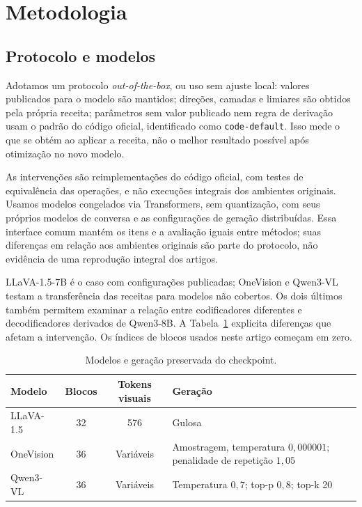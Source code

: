 \section{Metodologia}
\subsection{Protocolo e modelos}
Adotamos um protocolo \textit{out-of-the-box}, ou uso sem ajuste local: valores publicados para o modelo são mantidos; direções, camadas e limiares são obtidos pela própria receita; parâmetros sem valor publicado nem regra de derivação usam o padrão do código oficial, identificado como \texttt{code-default}. Isso mede o que se obtém ao aplicar a receita, não o melhor resultado possível após otimização no novo modelo.

As intervenções são reimplementações do código oficial, com testes de equivalência das operações, e não execuções integrais dos ambientes originais. Usamos modelos congelados via Transformers, sem quantização, com seus próprios modelos de conversa e as configurações de geração distribuídas. Essa interface comum mantém os itens e a avaliação iguais entre métodos; suas diferenças em relação aos ambientes originais são parte do protocolo, não evidência de uma reprodução integral dos artigos.

LLaVA-1.5-7B é o caso com configurações publicadas; OneVision e Qwen3-VL testam a transferência das receitas para modelos não cobertos. Os dois últimos também permitem examinar a relação entre codificadores diferentes e decodificadores derivados de Qwen3-8B. A Tabela~\ref{tab:modelos} explicita diferenças que afetam a intervenção. Os índices de blocos usados neste artigo começam em zero.

\begin{table}[t]
\centering\small
\caption{Modelos e geração preservada do checkpoint.}
\label{tab:modelos}
\setlength{\tabcolsep}{5pt}
\begin{tabular}{lccp{3.0cm}}
\toprule
Modelo & Blocos & Tokens visuais & Geração \\
\midrule
LLaVA-1.5 & 32 & 576 & Gulosa \\
OneVision & 36 & Variáveis & Amostragem, temperatura $0{,}000001$; penalidade de repetição $1{,}05$ \\
Qwen3-VL & 36 & Variáveis & Temperatura $0{,}7$; top-p $0{,}8$; top-k 20 \\
\bottomrule
\end{tabular}
\end{table}

